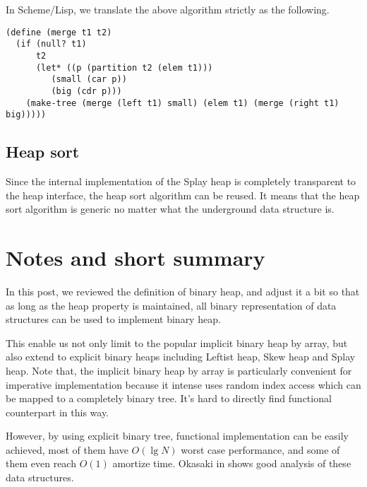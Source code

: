 \documentclass{article}
\begin{document}
In Scheme/Lisp, we translate the above algorithm strictly as the following.

\lstset{language=lisp}
\begin{lstlisting}
(define (merge t1 t2)
  (if (null? t1)
      t2
      (let* ((p (partition t2 (elem t1)))
	     (small (car p))
	     (big (cdr p)))
	(make-tree (merge (left t1) small) (elem t1) (merge (right t1) big)))))
\end{lstlisting}

\subsection{Heap sort}

Since the internal implementation of the Splay heap is completely
transparent to the heap interface, the heap sort algorithm can
be reused. It means that the heap sort algorithm is generic no
matter what the underground data structure is.

\section{Notes and short summary}

In this post, we reviewed the definition of binary heap, and adjust it
a bit so that as long as the heap property is maintained, all binary
representation of data structures can be used to implement binary heap.

This enable us not only limit to the popular implicit binary heap
by array, but also extend to explicit binary heaps including Leftist
heap, Skew heap and Splay heap. Note that, the implicit binary heap
by array is particularly convenient for imperative implementation
because it intense uses random index access which can be mapped to
a completely binary tree. It's hard to directly find functional
counterpart in this way. 

However, by using explicit binary tree, functional implementation
can be easily achieved, most of them have $O(\lg N)$ worst case 
performance, and some of them even reach $O(1)$ amortize time.
Okasaki in \cite{okasaki-book} shows good analysis of these data
structures.
\end{document}
